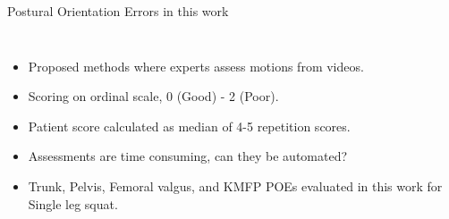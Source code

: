 \begin{frame}[fragile]{Postural Orientation Errors in this work}
  \begin{columns}[T,onlytextwidth]
    \raggedleft
      \raggedright
      \vspace{0.3cm}
      \begin{itemize}
        \item Proposed methods where experts assess motions from videos\footnotemark.
        \item Scoring on ordinal scale, 0 (Good) - 2 (Poor).
        \item Patient score calculated as median of 4-5 repetition scores.
        \item Assessments are time consuming, can they be automated?
        \item Trunk, Pelvis, Femoral valgus, and KMFP POEs evaluated in this work for Single leg squat.
      \end{itemize}



\end{columns}
\end{frame}
